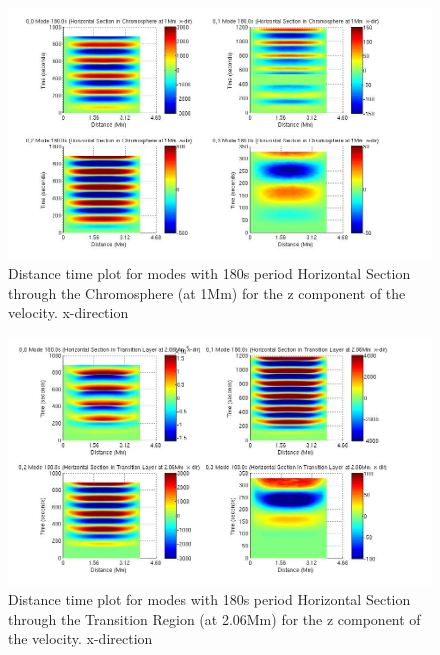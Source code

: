 \documentclass[final,1p]{elsarticle}
\begin{document}
\begin{figure}[h]
\includegraphics[scale=0.45]{imagesn/dt_180_horiz_x_1Mm.jpg}
\caption{Distance time plot for modes with 180s period Horizontal Section through the Chromosphere (at 1Mm) for the z  component of the velocity. x-direction}
\end{figure}

\begin{figure}[h]
\includegraphics[scale=0.5]{imagesn/dt_180_horiz_x_2p06Mm.jpg}
\caption{Distance time plot for modes with 180s period Horizontal Section through the Transition Region (at 2.06Mm) for the z  component of the velocity. x-direction}
\end{figure}
\end{document}
